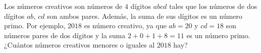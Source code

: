 Los números creativos son números de $4$ dígitos $abcd$ tales que los números de dos dígitos $ab$, $cd$ son ambos pares. Además, la suma de sus dígitos es un número primo. Por ejemplo, $2018$ es número creativo, ya que $ab = 20$ y $cd = 18$ son números pares de dos dígitos y la suma $2 + 0 + 1 + 8 = 11$ es un número primo. ¿Cuántos números creativos menores o iguales al $2018$ hay?